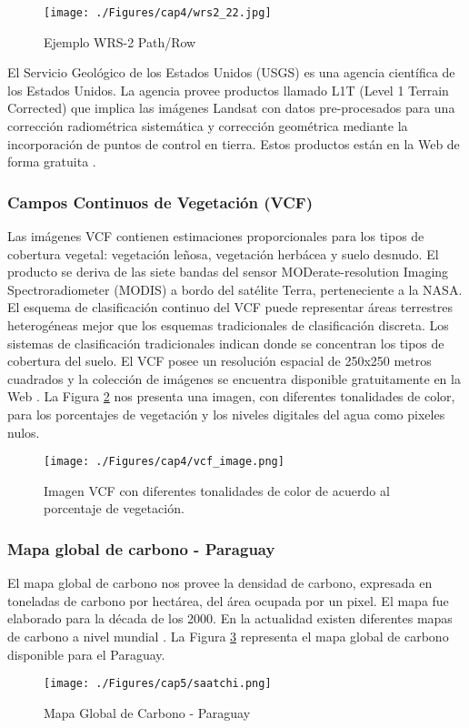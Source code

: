 \begin{figure}[H]
	\centering
	\texttt{[image: ./Figures/cap4/wrs2\_22.jpg]}
	\caption{Ejemplo WRS-2 Path/Row}
	\label{fig:wrs2Image}
\end{figure}

El Servicio Geol\'ogico de los Estados Unidos (USGS) es una agencia cient\'ifica de los Estados Unidos. La agencia provee productos llamado L1T (Level 1 Terrain Corrected) que implica las im\'agenes Landsat con datos pre-procesados para una correcci\'on radiom\'etrica sistem\'atica y correcci\'on geom\'etrica mediante la incorporaci\'on de puntos de control en tierra. Estos productos est\'an en la Web de forma gratuita \cite{landsatNasa}.


\subsubsection{Campos Continuos de Vegetaci\'on (VCF)}\label{sec:vcf}
Las im\'agenes VCF contienen estimaciones proporcionales para los tipos de cobertura vegetal: vegetaci\'on le\~{n}osa, vegetaci\'on herb\'acea y suelo desnudo. El producto se deriva de las siete bandas del sensor MODerate-resolution Imaging Spectroradiometer (MODIS) a bordo del sat\'elite Terra, perteneciente a la NASA. El esquema de clasificaci\'on continuo del VCF puede representar \'areas terrestres heterog\'eneas mejor que los esquemas tradicionales de clasificaci\'on discreta. Los sistemas de clasificaci\'on tradicionales indican donde se concentran los tipos de cobertura del suelo. El VCF posee un resoluci\'on espacial de 250x250 metros cuadrados y la colecci\'on de im\'agenes se encuentra disponible gratuitamente en la Web \cite{gl2015Uni}.
La Figura \ref{fig:vcfImage} nos presenta una imagen, con diferentes tonalidades de color, para los porcentajes de vegetaci\'on y los niveles digitales del agua como pixeles nulos.
\begin{figure}[H]
	\centering
	\texttt{[image: ./Figures/cap4/vcf\_image.png]}
	\caption{Imagen VCF con diferentes tonalidades de color de acuerdo al porcentaje de vegetaci\'on.}
	\label{fig:vcfImage}
\end{figure}
\subsubsection{Mapa global de carbono - Paraguay}\label{sec:saatchiMapa}
El mapa global de carbono \cite{saatchi2011benchmark} nos provee la densidad de carbono, expresada en toneladas de carbono por hect\'area, del \'area ocupada por un pixel. El mapa fue elaborado para la d\'ecada de los 2000. En la actualidad existen diferentes mapas de carbono a nivel mundial \cite{saatchi2011benchmark}. La Figura \ref{fig:saatchi} representa el mapa global de carbono disponible para el Paraguay.
\begin{figure}[H]
	\centering
	\texttt{[image: ./Figures/cap5/saatchi.png]}
	\caption{Mapa Global de Carbono - Paraguay}
	\label{fig:saatchi}
\end{figure}


